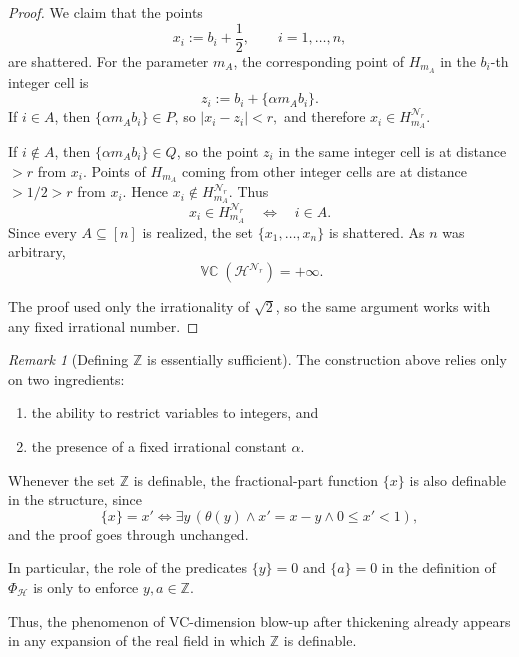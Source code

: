 \documentclass[11pt]{article}
\theoremstyle{plain}
\theoremstyle{definition}
\theoremstyle{remark}
\newtheorem{remark}[theorem]{Remark}
\DeclareMathOperator{\VCdim}{\mathbb{VC}}
\begin{document}
\begin{proof}
We claim that the points
\[
x_i:=b_i+\frac12,
\qquad i=1,\ldots,n,
\]
are shattered. For the parameter \(m_A\), the corresponding point of
\(H_{m_A}\) in the \(b_i\)-th integer cell is
\[
z_i:=b_i+\{\alpha m_A b_i\}.
\]
If \(i\in A\), then \(\{\alpha m_A b_i\}\in P\), so
\(
|x_i-z_i|<r,
\)
and therefore \(x_i\in H_{m_A}^{\mathcal N_r}\).

If \(i\notin A\), then \(\{\alpha m_A b_i\}\in Q\), so the point \(z_i\) in the
same integer cell is at distance \(>r\) from \(x_i\). Points of \(H_{m_A}\)
coming from other integer cells are at distance \(>1/2>r\) from \(x_i\). Hence
\(
x_i\notin H_{m_A}^{\mathcal N_r}.
\)
Thus
\[
x_i\in H_{m_A}^{\mathcal N_r}
\quad\Longleftrightarrow\quad
i\in A.
\]
Since every \(A\subseteq[n]\) is realized, the set
\(\{x_1,\ldots,x_n\}\) is shattered. As \(n\) was arbitrary,
\[
\VCdim(\mathcal H^{\mathcal N_r})=+\infty.
\]

The proof used only the irrationality of \(\sqrt2\), so the same argument works
with any fixed irrational number.
\end{proof}

\begin{remark}[Defining $\mathbb{Z}$ is essentially sufficient]
\label{rem:definable-Z-suffices}
The construction above relies only on two ingredients:
\begin{enumerate}
    \item the ability to restrict variables to integers, and
    \item the presence of a fixed irrational constant $\alpha$.
\end{enumerate}




Whenever the set \(\mathbb Z\) is definable, the fractional-part function
\(\{x\}\) is also definable in the structure, since
\[
\{x\}=x'
\iff
\exists y\,(\theta(y)\wedge x'=x-y\wedge 0\le x'<1),
\]
and the proof goes through unchanged.

In particular, the role of the predicates $\{y\}=0$ and $\{a\}=0$ in the
definition of $\Phi_{\mathcal H}$ is only to enforce $y,a\in\mathbb{Z}$.



Thus, the phenomenon of VC-dimension blow-up after thickening already appears
in any expansion of the real field in which $\mathbb{Z}$ is definable.
\end{remark}
\end{document}
